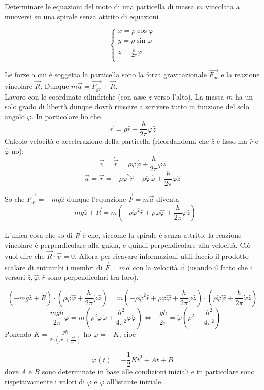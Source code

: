 \documentclass[../main.tex]{subfiles}
\begin{document}

\textex

Determinare le equazioni del moto di una particella di massa $m$ vincolata a muoversi su una spirale senza attrito di equazioni 

$$\begin{cases}
x=\rho\cos\varphi \\
y=\rho\sin\varphi \\
z=\frac{h}{2\pi}\varphi \\
\end{cases}$$


\solution

Le forze a cui è soggetta la particella sono la forza gravitazionale $\overrightarrow{F_{gr}}$ e la reazione vincolare $\overrightarrow{R}$. Dunque $m\overrightarrow{a} = \overrightarrow{F_{gr}} + \overrightarrow{R}$.\\

Lavoro con le coordinate cilindriche (con asse $z$ verso l'alto). La massa $m$ ha un solo grado di libertà dunque dovrò riuscire a scrivere tutto in funzione del solo angolo $\varphi$. In particolare ho che $$ \overrightarrow{r} = \rho\hat r + \frac{h}{2\pi}\varphi\hat z$$
Calcolo velocità e accelerazione della particella (ricordandomi che $\hat z$ è fisso ma $\hat r$ e $\hat \varphi$ no): $$ \overrightarrow{v} = \dot {\overrightarrow{r}} = \rho\dot\varphi\hat\varphi + \frac{h}{2\pi}\dot\varphi\hat z$$
$$\overrightarrow{a} = \ddot{\overrightarrow{r}} = -\rho{\dot\varphi}^2\hat r +  \rho \ddot\varphi\hat\varphi + \frac{h}{2\pi}\ddot\varphi\hat z$$

So che $\overrightarrow{F_{gr}} = -mg\hat z$ dunque l'equazione $\overrightarrow{F} = m\overrightarrow{a}$ diventa $$-mg\hat z + \overrightarrow{R} = m\left ( -\rho{\dot\varphi}^2\hat r +  \rho \ddot\varphi\hat\varphi + \frac{h}{2\pi}\ddot\varphi\hat z\right )$$

L'unica cosa che so di $\overrightarrow R$ è che, siccome la spirale è senza attrito, la reazione vincolare è perpendicolare alla guida, e quindi perpendicolare alla velocità. Ciò vuol dire che $\overrightarrow R \cdot \overrightarrow v = 0$. Allora per ricavare informazioni utili faccio il prodotto scalare di entrambi i membri di $\overrightarrow{F} = m\overrightarrow{a}$ con la velocità $\overrightarrow v$ (usando il fatto che i versori $\hat z, \hat\varphi, \hat r$ sono perpendicolari tra loro).

$$\left (-mg\hat z + \overrightarrow R\right )\cdot \left ( \rho\dot\varphi\hat\varphi + \frac{h}{2\pi}\dot\varphi\hat z\right ) = m\left (  -\rho{\dot\varphi}^2\hat r +  \rho \ddot\varphi\hat\varphi + \frac{h}{2\pi}\ddot\varphi\hat z\right )\cdot   \left ( \rho\dot\varphi\hat\varphi + \frac{h}{2\pi}\dot\varphi\hat z\right )   $$
$$-\frac{mgh}{2\pi}\dot\varphi = m\left ( \rho^2\dot\varphi\ddot\varphi + \frac{h^2}{4\pi^2}\dot\varphi\ddot\varphi\right ) \Leftrightarrow -\frac{gh}{2\pi} = \ddot\varphi\left ( \rho^2+\frac{h^2}{4\pi^2}\right ) $$
Ponendo $K = \frac{gh}{2\pi\left ( \rho^2 + \frac{h^2}{4\pi^2}\right ) }$ ho $\ddot\varphi =- K$, cioè

$$\varphi\left ( t \right ) =- \frac{1}{2}Kt^2 + At + B$$
dove $A$ e $B$ sono determinate in base alle condizioni iniziali e in particolare sono rispettivamente i valori di $\varphi$ e $\dot\varphi$ all'istante iniziale.
\end{document}
